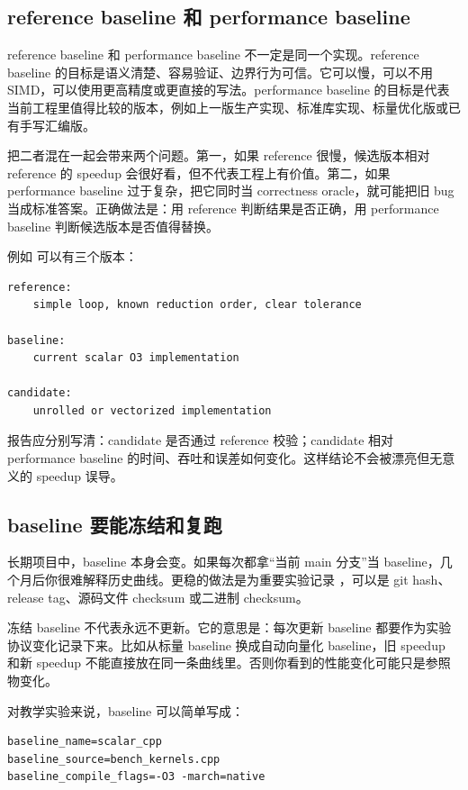\subsection{reference baseline 和 performance baseline}

reference baseline 和 performance baseline 不一定是同一个实现。reference baseline 的目标是语义清楚、容易验证、边界行为可信。它可以慢，可以不用 SIMD，可以使用更高精度或更直接的写法。performance baseline 的目标是代表当前工程里值得比较的版本，例如上一版生产实现、标准库实现、标量优化版或已有手写汇编版。

把二者混在一起会带来两个问题。第一，如果 reference 很慢，候选版本相对 reference 的 speedup 会很好看，但不代表工程上有价值。第二，如果 performance baseline 过于复杂，把它同时当 correctness oracle，就可能把旧 bug 当成标准答案。正确做法是：用 reference 判断结果是否正确，用 performance baseline 判断候选版本是否值得替换。

例如  可以有三个版本：

\begin{lstlisting}
reference:
    simple loop, known reduction order, clear tolerance

baseline:
    current scalar O3 implementation

candidate:
    unrolled or vectorized implementation
\end{lstlisting}

报告应分别写清：candidate 是否通过 reference 校验；candidate 相对 performance baseline 的时间、吞吐和误差如何变化。这样结论不会被漂亮但无意义的 speedup 误导。

\subsection{baseline 要能冻结和复跑}

长期项目中，baseline 本身会变。如果每次都拿“当前 main 分支”当 baseline，几个月后你很难解释历史曲线。更稳的做法是为重要实验记录 ，可以是 git hash、release tag、源码文件 checksum 或二进制 checksum。

冻结 baseline 不代表永远不更新。它的意思是：每次更新 baseline 都要作为实验协议变化记录下来。比如从标量 baseline 换成自动向量化 baseline，旧 speedup 和新 speedup 不能直接放在同一条曲线里。否则你看到的性能变化可能只是参照物变化。

对教学实验来说，baseline 可以简单写成：

\begin{lstlisting}
baseline_name=scalar_cpp
baseline_source=bench_kernels.cpp
baseline_compile_flags=-O3 -march=native
\end{lstlisting}

